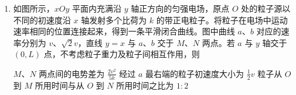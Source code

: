 \documentclass[\gkver]{gaokaozhenti}
\begin{document}
\begin{enumerate}
{$S_{2}$ 接 $b$ 时：仅有灯泡和一个电阻串联接入电源，电路总电阻 $R_{\text{总}b}=R_{L}+R+r=7 \UO$

总电流 $I_{b}=\frac{E}{R_{\text{总}b}}=\frac{6}{7} \UA$

灯泡两端电压：$U_{Lb}=I_{b}\cdot R_{L}=\frac{6}{7}\times3 \UV\approx2.57 \UV$

观察图 2 电压表示数约为 $2.57 \UV$，显然接 $b$，故 B 错误，C 正确；

D．$S_{2}$ 接 $b$ 时，外电路电功率：$P_{\text{外}}=I_{b}^{2}(R_{L}+R)\approx4.41 \UW$，故 D 错误。

故选 AC。
}
\item
如图所示，$xOy$ 平面内充满沿 $y$ 轴正方向的匀强电场，原点 $O$ 处的粒子源以不同的初速度沿 $x$ 轴发射多个比荷为 $k$ 的带正电粒子。将粒子在电场中运动速率相同的位置连接起来，得到一条平滑闭合曲线。图中曲线 $a$、$b$ 对应的速率分别为 $v$、$\sqrt{2}v$，直线 $y=x$ 与 $a$、$b$ 交于 $M$、$N$ 两点。若 $a$ 与 $y$ 轴交于 $(0,L)$ 点，不考虑粒子重力及粒子间相互作用，则 

{$M$、$N$ 两点间的电势差为 $\frac{2v^{2}}{5k}$}
{经过 $a$ 最右端的粒子初速度大小为 $\frac{1}{2}v$}
{粒子从 $O$ 到 $M$ 所用时间与从 $O$ 到 $N$ 所用时间之比为 $1:2$}


\end{enumerate}
\end{document}

